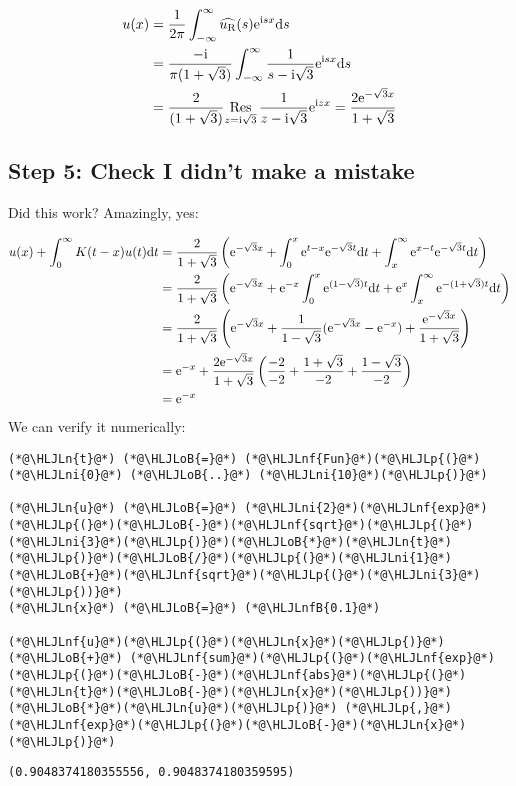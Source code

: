 \documentclass[12pt,landscape]{article}
\newcommand{\HLJLn}[1]{#1}
\newcommand{\HLJLnf}[1]{\textcolor[RGB]{66,102,213}{#1}}
\newcommand{\HLJLnfB}[1]{\textcolor[RGB]{59,151,46}{#1}}
\newcommand{\HLJLni}[1]{\textcolor[RGB]{59,151,46}{#1}}
\newcommand{\HLJLoB}[1]{\textcolor[RGB]{102,102,102}{\textbf{#1}}}
\newcommand{\HLJLp}[1]{#1}
\def\D{ {\rm d} }
\def\I{ {\rm i} }
\def\E{ {\rm e} }
\def\Res_#1{\underset{#1}{\rm Res}\,}
\def\dt{\D t}
\def\ds{\D s}
\begin{document}
{\begin{align*}
u(x) &= {1 \over 2 \pi} \int_{-\infty}^\infty \widehat{u_{\rm R}}(s) \E^{\I s x} \ds  \\
&= {-\I \over \pi(1+\sqrt{3})} \int_{-\infty}^\infty {1 \over s-\I \sqrt 3} \E^{\I s x} \ds  \\
&= {2   \over (1+\sqrt{3})} \Res_{z=\I \sqrt 3} {1 \over z-\I \sqrt 3} \E^{\I z x}  =
{2 \E^{-\sqrt{3}x}    \over 1+\sqrt{3}}
\end{align*}
\newpage
\subsection{Step 5: Check I didn't make a mistake}
Did this work? Amazingly, yes:


\begin{align*}
u(x) + \int_0^\infty K(t -x) u(t) \dt &= {2   \over 1+\sqrt{3}} \left(  \E^{-\sqrt{3}x}  +   \int_0^x \E^{t-x} \E^{-\sqrt{3}t} \dt +  \int_x^\infty \E^{x-t} \E^{-\sqrt{3}t}\dt \right) \\
&={2    \over 1+\sqrt{3}}\left( \E^{-\sqrt{3}x}   +  \E^{-x}    \int_0^x \E^{(1-\sqrt{3})t} \dt + \E^x  \int_x^\infty  \E^{-(1+\sqrt{3})t}\dt \right) \\
&={2     \over 1+\sqrt{3}}\left( \E^{-\sqrt{3}x}  + {1  \over 1-\sqrt 3}   (\E^{-\sqrt{3}x} - \E^{-x}) + { \E^{-\sqrt 3 x } \over 1+\sqrt{3}} \right) \\
&=\E^{-x} + {2  \E^{-\sqrt{3}x}   \over 1+\sqrt{3}}\left({-2 \over -2}   + {1+ \sqrt 3  \over -2} + {1 - \sqrt 3 \over -2} \right)  \\
&= \E^{-x}
\end{align*}
We can verify it numerically:


\begin{lstlisting}
(*@\HLJLn{t}@*) (*@\HLJLoB{=}@*) (*@\HLJLnf{Fun}@*)(*@\HLJLp{(}@*)(*@\HLJLni{0}@*) (*@\HLJLoB{..}@*) (*@\HLJLni{10}@*)(*@\HLJLp{)}@*)

(*@\HLJLn{u}@*) (*@\HLJLoB{=}@*) (*@\HLJLni{2}@*)(*@\HLJLnf{exp}@*)(*@\HLJLp{(}@*)(*@\HLJLoB{-}@*)(*@\HLJLnf{sqrt}@*)(*@\HLJLp{(}@*)(*@\HLJLni{3}@*)(*@\HLJLp{)}@*)(*@\HLJLoB{*}@*)(*@\HLJLn{t}@*)(*@\HLJLp{)}@*)(*@\HLJLoB{/}@*)(*@\HLJLp{(}@*)(*@\HLJLni{1}@*)(*@\HLJLoB{+}@*)(*@\HLJLnf{sqrt}@*)(*@\HLJLp{(}@*)(*@\HLJLni{3}@*)(*@\HLJLp{))}@*)
(*@\HLJLn{x}@*) (*@\HLJLoB{=}@*) (*@\HLJLnfB{0.1}@*)

(*@\HLJLnf{u}@*)(*@\HLJLp{(}@*)(*@\HLJLn{x}@*)(*@\HLJLp{)}@*) (*@\HLJLoB{+}@*) (*@\HLJLnf{sum}@*)(*@\HLJLp{(}@*)(*@\HLJLnf{exp}@*)(*@\HLJLp{(}@*)(*@\HLJLoB{-}@*)(*@\HLJLnf{abs}@*)(*@\HLJLp{(}@*)(*@\HLJLn{t}@*)(*@\HLJLoB{-}@*)(*@\HLJLn{x}@*)(*@\HLJLp{))}@*)(*@\HLJLoB{*}@*)(*@\HLJLn{u}@*)(*@\HLJLp{)}@*) (*@\HLJLp{,}@*) (*@\HLJLnf{exp}@*)(*@\HLJLp{(}@*)(*@\HLJLoB{-}@*)(*@\HLJLn{x}@*)(*@\HLJLp{)}@*)
\end{lstlisting}

\begin{lstlisting}
(0.9048374180355556, 0.9048374180359595)
\end{lstlisting}


}
\end{document}
